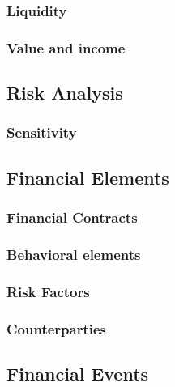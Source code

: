 \documentclass[
  12pt,
]{article}
\begin{document}
\hypertarget{liquidity}{%
\subsubsection{Liquidity}\label{liquidity}}

\hypertarget{value-and-income}{%
\subsubsection{Value and income}\label{value-and-income}}

\hypertarget{risk-analysis}{%
\subsection{Risk Analysis}\label{risk-analysis}}

\hypertarget{sensitivity}{%
\subsubsection{Sensitivity}\label{sensitivity}}

\hypertarget{financial-elements}{%
\subsection{Financial Elements}\label{financial-elements}}

\hypertarget{financial-contracts}{%
\subsubsection{Financial Contracts}\label{financial-contracts}}

\hypertarget{behavioral-elements}{%
\subsubsection{Behavioral elements}\label{behavioral-elements}}

\hypertarget{risk-factors}{%
\subsubsection{Risk Factors}\label{risk-factors}}

\hypertarget{counterparties}{%
\subsubsection{Counterparties}\label{counterparties}}

\hypertarget{financial-events}{%
\subsection{Financial Events}\label{financial-events}}
\end{document}
